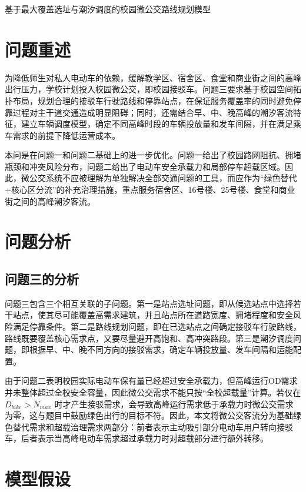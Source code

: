 \documentclass[UTF8,zihao=-4,a4paper]{ctexart}
\begin{document}
\begin{center}
{\heiti{} 基于最大覆盖选址与潮汐调度的校园微公交路线规划模型}
\end{center}

\section{问题重述}

为降低师生对私人电动车的依赖，缓解教学区、宿舍区、食堂和商业街之间的高峰出行压力，学校计划投入校园微公交，即校园接驳车。问题三要求基于校园空间拓扑布局，规划合理的接驳车行驶路线和停靠站点，在保证服务覆盖率的同时避免停靠过程对主干道交通造成明显阻碍；同时，还需结合早、中、晚高峰的潮汐客流特征，建立车辆调度模型，确定不同高峰时段的车辆投放量和发车间隔，并在满足乘车需求的前提下降低运营成本。

本问是在问题一和问题二基础上的进一步优化。问题一给出了校园路网阻抗、拥堵瓶颈和冲突风险分布，问题二给出了电动车安全承载力和局部停车超载区域。因此，微公交系统不应被理解为单独解决全部交通问题的工具，而应作为“绿色替代+核心区分流”的补充治理措施，重点服务宿舍区、16号楼、25号楼、食堂和商业街之间的高峰潮汐客流。

\section{问题分析}

\subsection{问题三的分析}

问题三包含三个相互关联的子问题。第一是站点选址问题，即从候选站点中选择若干站点，使其尽可能覆盖高需求建筑，并且站点所在道路宽度、拥堵程度和安全风险满足停靠条件。第二是路线规划问题，即在已选站点之间确定接驳车行驶路线，路线既要覆盖核心需求点，又要尽量避开高饱和、高冲突路段。第三是潮汐调度问题，即根据早、中、晚不同方向的接驳需求，确定车辆投放量、发车间隔和运能配置。

由于问题二表明校园实际电动车保有量已经超过安全承载力，但高峰运行OD需求并未整体超过全校安全容量，因此微公交需求不能只按“全校超载量”计算。若仅在 $D_{bike}>N_{max}$ 时才产生接驳需求，会导致高峰运行需求低于承载力时微公交需求为零，这与题目中鼓励绿色出行的目标不符。因此，本文将微公交客流分为基础绿色替代需求和超载治理需求两部分：前者表示主动吸引部分电动车用户转向接驳车，后者表示当高峰电动车需求超过承载力时对超载部分进行额外转移。

\section{模型假设}
\end{document}
